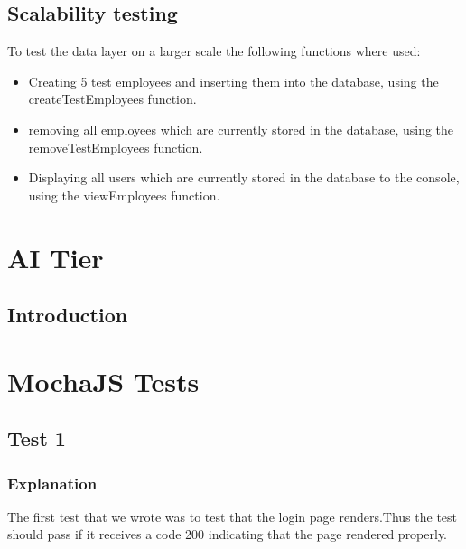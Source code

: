 \documentclass[]{article}
\begin{document}
    \subsection{Scalability testing}
    \begin{flushleft}
        To test the data layer on a larger scale the following functions where used:
        \begin{itemize}
    	    \item Creating 5 test employees and inserting them into the database, using the createTestEmployees function.
    	    
    	    \item removing all employees which are currently stored in the database, using the removeTestEmployees function.
    	    
    	    \item Displaying all users which are currently stored in the database to the console, using the viewEmployees function. 
    	    
        \end{itemize}
    \end{flushleft}
    
	\section{AI Tier}
	\subsection{Introduction}
	\begin{flushleft}
	
	\end{flushleft}
	
	\newpage
	\section{MochaJS Tests}
		\subsection{Test 1}
			\subsubsection{Explanation}
			The first test that we wrote was to test that the login page renders.Thus the test should pass if it receives a code 200 indicating that the page rendered properly.\linebreak
			
\end{document}
